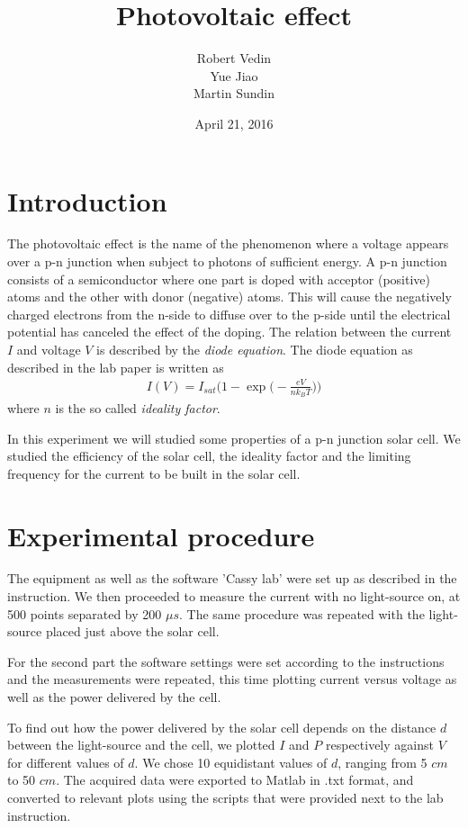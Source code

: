\documentclass[a4paper]{article}
\title{Photovoltaic effect}
\author{Robert Vedin \\ Yue Jiao \\ Martin Sundin}
\date{April 21, 2016}
\begin{document}
\maketitle


\section{Introduction}

The photovoltaic effect is the name of the phenomenon where a voltage appears over a p-n junction when subject to photons of sufficient energy. A p-n junction consists of a semiconductor where one part is doped with acceptor (positive) atoms and the other with donor (negative) atoms. This will cause the negatively charged electrons from the n-side to diffuse over to the p-side until the electrical potential has canceled the effect of the doping. The relation between the current $I$ and voltage $V$ is described by the {\it diode equation}. The diode equation as described in the lab paper is written as
\begin{align}\label{diode_eq}
	I(V) = I_{sat} \bigg(1 - \exp\Big(-\frac{eV}{n k_B T}\Big) \bigg)
\end{align}
where $n$ is the so called \emph{ideality factor}.

In this experiment we will studied some properties of a p-n junction solar cell. We studied the efficiency of the solar cell, the ideality factor and the limiting frequency for the current to be built in the solar cell. 

\section{Experimental procedure}

The equipment as well as the software 'Cassy lab' were set up as described in the instruction. We then proceeded to measure the current with no light-source on, at 500 points separated by 200 $\mu s$. The same procedure was repeated with the light-source placed just above the solar cell.

For the second part the software settings were set according to the instructions and the measurements were repeated, this time plotting current versus voltage as well as the power delivered by the cell.

To find out how the power delivered by the solar cell depends on the distance $d$ between the light-source and the cell, we plotted $I$ and $P$ respectively against $V$ for different values of $d$. We chose 10 equidistant values of $d$, ranging from 5 $cm$ to 50 $cm$. The acquired data were exported to Matlab in .txt format, and converted to relevant plots using the scripts that were provided next to the lab instruction. 
\end{document}
